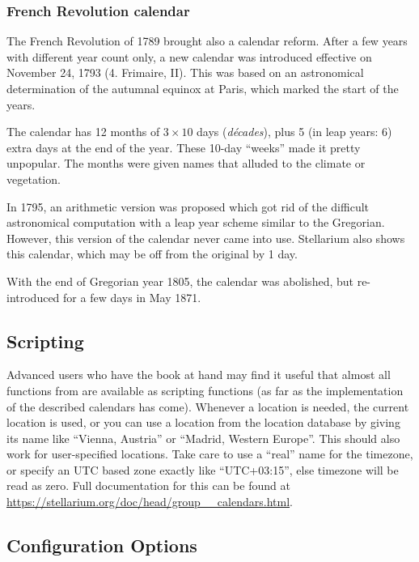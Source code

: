 \subsubsection{French Revolution calendar}
The French Revolution of 1789 brought also a calendar reform. After a
few years with different year count only, a new calendar was
introduced effective on November 24, 1793 (4. Frimaire, II). This was
based on an astronomical determination of the autumnal equinox at
Paris, which marked the start of the years.

The calendar has 12 months of $3\times 10$ days (\emph{d\'ecades}), plus
5 (in leap years: 6) extra days at the end of the year. These 10-day
``weeks'' made it pretty unpopular. The months were given names that
alluded to the climate or vegetation.

In 1795, an arithmetic version was proposed which
got rid of the difficult astronomical computation with a leap year
scheme similar to the Gregorian. However, this version of the calendar
never came into use.  Stellarium also shows this calendar, which
may be off from the original by 1 day.

With the end of Gregorian year 1805, the calendar was abolished, but
re-introduced for a few days in May 1871.

\subsection{Scripting}

Advanced users who have the book at hand may find it useful
that almost all functions from
\citet{Reingold-Dershowitz:2018} are available as scripting functions
(as far as the implementation of the described calendars has
come). Whenever a location is needed, the current location is used, or
you can use a location from the location database by giving its name
like ``Vienna, Austria'' or ``Madrid, Western Europe''. This should
also work for user-specified locations. Take care to use a ``real''
name for the timezone, or specify an UTC based zone exactly like
``UTC+03:15'', else timezone will be read as zero. Full documentation
for this can be found at
\url{https://stellarium.org/doc/head/group__calendars.html}.

\subsection{Configuration Options}
\label{sec:plugin:Calendars:configuration}


